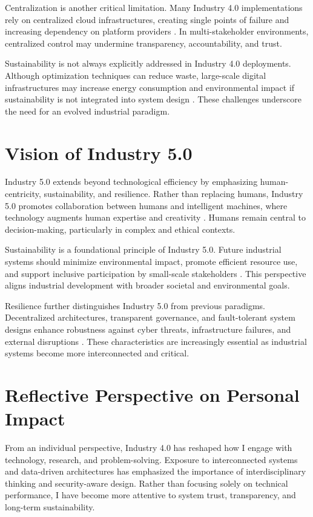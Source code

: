 \documentclass[conference]{IEEEtran}
\begin{document}
Centralization is another critical limitation. Many Industry 4.0 implementations rely on centralized cloud infrastructures, creating single points of failure and increasing dependency on platform providers \cite{schwab2016}. In multi-stakeholder environments, centralized control may undermine transparency, accountability, and trust.

Sustainability is not always explicitly addressed in Industry 4.0 deployments. Although optimization techniques can reduce waste, large-scale digital infrastructures may increase energy consumption and environmental impact if sustainability is not integrated into system design \cite{bonilla2018}. These challenges underscore the need for an evolved industrial paradigm.

\section{Vision of Industry 5.0}
Industry 5.0 extends beyond technological efficiency by emphasizing human-centricity, sustainability, and resilience. Rather than replacing humans, Industry 5.0 promotes collaboration between humans and intelligent machines, where technology augments human expertise and creativity \cite{eu2021}. Humans remain central to decision-making, particularly in complex and ethical contexts.

Sustainability is a foundational principle of Industry 5.0. Future industrial systems should minimize environmental impact, promote efficient resource use, and support inclusive participation by small-scale stakeholders \cite{fao2020}. This perspective aligns industrial development with broader societal and environmental goals.

Resilience further distinguishes Industry 5.0 from previous paradigms. Decentralized architectures, transparent governance, and fault-tolerant system designs enhance robustness against cyber threats, infrastructure failures, and external disruptions \cite{mtetwa2022}. These characteristics are increasingly essential as industrial systems become more interconnected and critical.

\section{Reflective Perspective on Personal Impact}
From an individual perspective, Industry 4.0 has reshaped how I engage with technology, research, and problem-solving. Exposure to interconnected systems and data-driven architectures has emphasized the importance of interdisciplinary thinking and security-aware design. Rather than focusing solely on technical performance, I have become more attentive to system trust, transparency, and long-term sustainability.
\end{document}
